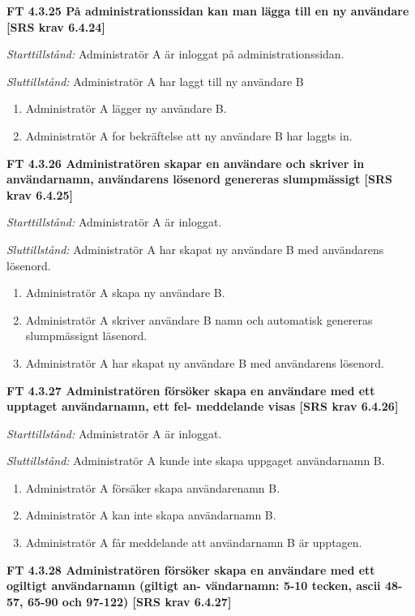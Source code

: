 \documentclass[a4paper]{article}
\begin{document}
\textbf{FT 4.3.25 På administrationssidan kan man lägga till en ny användare [SRS krav 6.4.24]}

\emph{Starttillstånd:} Administratör A är inloggat på administrationssidan.

\emph{Sluttillstånd:} Administratör A har laggt till ny  användare B

\begin{enumerate}
\item Administratör A lägger ny användare B.
\item Administratör A for bekräftelse att  ny användare B har laggts in. 
\end{enumerate}

\textbf{FT 4.3.26 Administratören skapar en användare och skriver in användarnamn, användarens lösenord genereras slumpmässigt [SRS krav 6.4.25]}

\emph{Starttillstånd:} Administratör A är inloggat.

\emph{Sluttillstånd:} Administratör A har skapat  ny  användare B med användarens  lösenord.

\begin{enumerate}
\item Administratör A skapa ny användare B.
\item Administratör A skriver användare B namn och automatisk genereras slumpmässignt läsenord.
\item Administratör A har skapat  ny  användare B med användarens  lösenord.
\end{enumerate}

\textbf{FT 4.3.27 Administratören försöker skapa en användare med ett upptaget användarnamn, ett fel- meddelande visas [SRS krav 6.4.26]}

\emph{Starttillstånd:} Administratör A är inloggat.

\emph{Sluttillstånd:} Administratör A kunde inte skapa uppgaget användarnamn B.

\begin{enumerate}
\item Administratör A försäker skapa användarenamn B.
\item Administratör A kan inte  skapa användarnamn B. 
\item Administratör A får meddelande att användarnamn B är upptagen.
\end{enumerate}

\textbf{FT 4.3.28 Administratören försöker skapa en användare med ett ogiltigt användarnamn (giltigt an- vändarnamn: 5-10 tecken, ascii 48-57, 65-90 och 97-122) [SRS krav 6.4.27]} 
\end{document}
